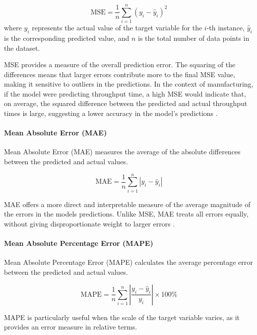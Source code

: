 \begin{equation}
  \text{MSE} = \frac{1}{n} \sum_{i=1}^{n} (y_i - \hat{y}_i)^2
\end{equation}
where $y_i$ represents the actual value of the target variable for the $i$-th instance, $\hat{y}_i$ is the corresponding predicted value, and $n$ is the total number of data points in the dataset.

MSE provides a measure of the overall prediction error. The squaring of the differences means that larger errors contribute more to the final MSE value, making it sensitive to outliers in the predictions. In the context of manufacturing, if the model were predicting throughput time, a high MSE would indicate that, on average, the squared difference between the predicted and actual throughput times is large, suggesting a lower accuracy in the model's predictions \autocite{fahrmeir2016statistik}.

\paragraph{\textbf{Mean Absolute Error (MAE)}}
Mean Absolute Error (MAE) measures the average of the absolute differences between the predicted and actual values.

\begin{equation}
  \text{MAE} = \frac{1}{n} \sum_{i=1}^{n} |y_i - \hat{y}_i|
\end{equation}

MAE offers a more direct and interpretable measure of the average magnitude of the errors in the models predictions. Unlike MSE, MAE treats all errors equally, without giving disproportionate weight to larger errors \autocite{fahrmeir2016statistik}.

\paragraph{\textbf{Mean Absolute Percentage Error (MAPE)}}
Mean Absolute Percentage Error (MAPE) calculates the average percentage error between the predicted and actual values.

\begin{equation}
  \text{MAPE} = \frac{1}{n} \sum_{i=1}^{n} \left| \frac{y_i - \hat{y}_i}{y_i} \right| \times 100\%
\end{equation}

MAPE is particularly useful when the scale of the target variable varies, as it provides an error measure in relative terms.

